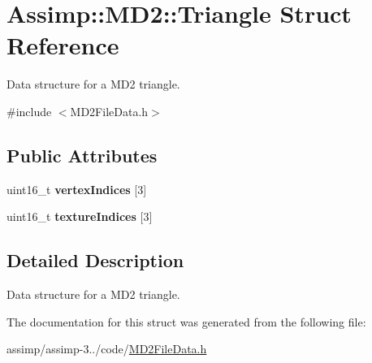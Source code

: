 \hypertarget{struct_assimp_1_1_m_d2_1_1_triangle}{\section{Assimp\+:\+:M\+D2\+:\+:Triangle Struct Reference}
\label{struct_assimp_1_1_m_d2_1_1_triangle}
}


Data structure for a M\+D2 triangle.  




{\ttfamily \#include $<$M\+D2\+File\+Data.\+h$>$}

\subsection*{Public Attributes}
\begin{DoxyCompactItemize}
\item 
\hypertarget{struct_assimp_1_1_m_d2_1_1_triangle_a92fe9bf876559e0464e3e384476b13c8}{uint16\+\_\+t {\bfseries vertex\+Indices} \mbox{[}3\mbox{]}}\label{struct_assimp_1_1_m_d2_1_1_triangle_a92fe9bf876559e0464e3e384476b13c8}

\item 
\hypertarget{struct_assimp_1_1_m_d2_1_1_triangle_a166ed32ca7137909c0c30ed4431e8959}{uint16\+\_\+t {\bfseries texture\+Indices} \mbox{[}3\mbox{]}}\label{struct_assimp_1_1_m_d2_1_1_triangle_a166ed32ca7137909c0c30ed4431e8959}

\end{DoxyCompactItemize}


\subsection{Detailed Description}
Data structure for a M\+D2 triangle. 

The documentation for this struct was generated from the following file\+:\begin{DoxyCompactItemize}
\item 
assimp/assimp-\/3../code/\hyperlink{_m_d2_file_data_8h}{M\+D2\+File\+Data.\+h}\end{DoxyCompactItemize}
